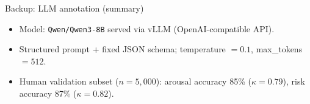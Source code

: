 \documentclass[aspectratio=169]{beamer}
\begin{document}
\begin{frame}{Backup: LLM annotation (summary)}
  \begin{itemize}
    \item Model: \texttt{Qwen/Qwen3-8B} served via vLLM (OpenAI-compatible API).
    \item Structured prompt + fixed JSON schema; temperature $=0.1$, max\_tokens $=512$.
    \item Human validation subset ($n=5{,}000$): arousal accuracy 85\% ($\kappa=0.79$), risk accuracy 87\% ($\kappa=0.82$).
  \end{itemize}
\end{frame}
\end{document}
